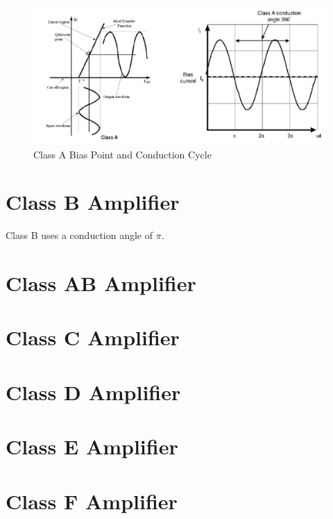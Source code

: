 
\begin{figure}
  \centering
  \includegraphics[width=6in]{figures/classa}
  \caption{Class A Bias Point and Conduction Cycle}\label{classa_bias}
\end{figure}

\section{Class B Amplifier}

Class B uses a conduction angle of $\pi$.

\section{Class AB Amplifier}

\section{Class C Amplifier}

\section{Class D Amplifier}

\section{Class E Amplifier}



\section{Class F Amplifier}

